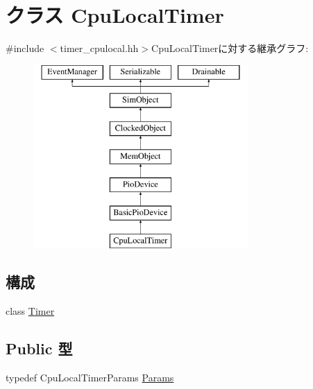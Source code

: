 \hypertarget{classCpuLocalTimer}{
\section{クラス CpuLocalTimer}
\label{classCpuLocalTimer}
}


{\ttfamily \#include $<$timer\_\-cpulocal.hh$>$}CpuLocalTimerに対する継承グラフ:\begin{figure}[H]
\begin{center}
\leavevmode
\includegraphics[height=7cm]{classCpuLocalTimer}
\end{center}
\end{figure}
\subsection*{構成}
\begin{DoxyCompactItemize}
\item 
class \hyperlink{classCpuLocalTimer_1_1Timer}{Timer}
\end{DoxyCompactItemize}
\subsection*{Public 型}
\begin{DoxyCompactItemize}
\item 
typedef CpuLocalTimerParams \hyperlink{classCpuLocalTimer_a2abacbbb646e91ed1ef591d6ce81f4e3}{Params}
\end{DoxyCompactItemize}
